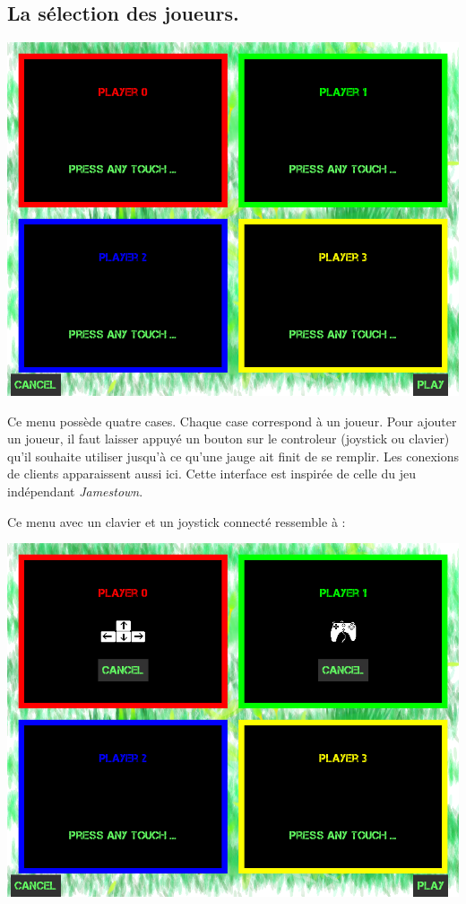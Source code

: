 \documentclass{article}
\begin{document}
\subsection{La sélection des joueurs.} \label{select}
\begin{center}
	\includegraphics[scale=0.4]{img/empty.png}
\end{center}
Ce menu possède quatre cases. Chaque case correspond à un joueur. Pour ajouter un joueur, il faut laisser appuyé un bouton sur le controleur (joystick ou clavier) qu'il souhaite utiliser jusqu'à ce qu'une jauge ait finit de se remplir. Les conexions de clients apparaissent aussi ici. Cette interface est inspirée de celle du jeu indépendant \emph{Jamestown}.

Ce menu avec un clavier et un joystick connecté ressemble à :
\begin{center}
	\includegraphics[scale=0.4]{img/full.png}
\end{center}
\end{document}
